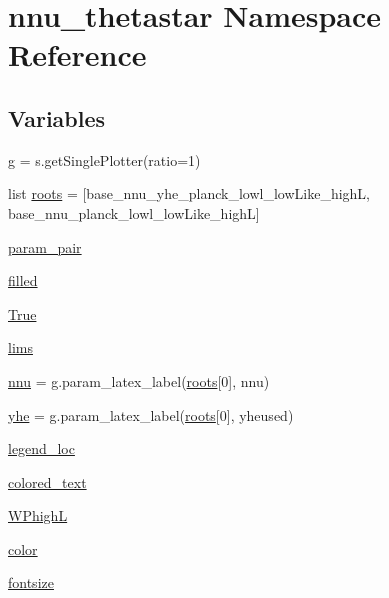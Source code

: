 \hypertarget{namespacennu__thetastar}{}\section{nnu\+\_\+thetastar Namespace Reference}
\label{namespacennu__thetastar}
\subsection*{Variables}
\begin{DoxyCompactItemize}
\item 
\mbox{\hyperlink{namespacennu__thetastar_a1ffb59b542ca24756a3e0378230c4cc7}{g}} = s.\+get\+Single\+Plotter(ratio=1)
\item 
list \mbox{\hyperlink{namespacennu__thetastar_a058a195b1f456a5b0bd2f1caf0356808}{roots}} = \mbox{[}\textquotesingle{}base\+\_\+nnu\+\_\+yhe\+\_\+planck\+\_\+lowl\+\_\+low\+Like\+\_\+highL\textquotesingle{}, \textquotesingle{}base\+\_\+nnu\+\_\+planck\+\_\+lowl\+\_\+low\+Like\+\_\+highL\textquotesingle{}\mbox{]}
\item 
\mbox{\hyperlink{namespacennu__thetastar_a619a012efbd9a6da3b8f1c7e53798893}{param\+\_\+pair}}
\item 
\mbox{\hyperlink{namespacennu__thetastar_a216c3a1da5298df422a08abe754aa9d0}{filled}}
\item 
\mbox{\hyperlink{namespacennu__thetastar_a53de1b6e54ee2b8bf61264ce8eba208a}{True}}
\item 
\mbox{\hyperlink{namespacennu__thetastar_a6da3ee1b486e391d1e9faddc477a7a08}{lims}}
\item 
\mbox{\hyperlink{namespacennu__thetastar_a7943ea00db5944d63bd65d3c79587621}{nnu}} = g.\+param\+\_\+latex\+\_\+label(\mbox{\hyperlink{namespacennu__thetastar_a058a195b1f456a5b0bd2f1caf0356808}{roots}}\mbox{[}0\mbox{]}, \textquotesingle{}nnu\textquotesingle{})
\item 
\mbox{\hyperlink{namespacennu__thetastar_a6e5b750a53eeae47c1404ca25214b52c}{yhe}} = g.\+param\+\_\+latex\+\_\+label(\mbox{\hyperlink{namespacennu__thetastar_a058a195b1f456a5b0bd2f1caf0356808}{roots}}\mbox{[}0\mbox{]}, \textquotesingle{}yheused\textquotesingle{})
\item 
\mbox{\hyperlink{namespacennu__thetastar_ab11cc376a90d72ecbf45507876620695}{legend\+\_\+loc}}
\item 
\mbox{\hyperlink{namespacennu__thetastar_ad47a2622c535f54df52d809fabddfcbd}{colored\+\_\+text}}
\item 
\mbox{\hyperlink{namespacennu__thetastar_a9a88bb88dbbe3a494b6df8b5e681b775}{W\+PhighL}}
\item 
\mbox{\hyperlink{namespacennu__thetastar_a98e46e5eb36a68e4df41379a6d9b7f41}{color}}
\item 
\mbox{\hyperlink{namespacennu__thetastar_ad5d99a820c99475d6f520a717ec9d5d6}{fontsize}}
\end{DoxyCompactItemize}


